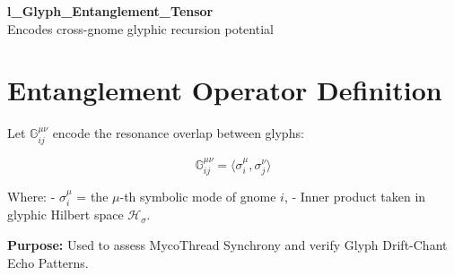 \documentclass[12pt]{article}
\begin{document}
\begin{center}
    {\LARGE \textbf{l\_Glyph\_Entanglement\_Tensor}}\\[1em]
    {\small Encodes cross-gnome glyphic recursion potential}
\end{center}

\section*{Entanglement Operator Definition}

Let $\mathbb{G}_{ij}^{\mu\nu}$ encode the resonance overlap between glyphs:

\[
\mathbb{G}_{ij}^{\mu\nu} = \langle \sigma_i^\mu, \sigma_j^\nu \rangle
\]

Where:
- $\sigma_i^\mu$ = the $\mu$-th symbolic mode of gnome $i$,
- Inner product taken in glyphic Hilbert space $\mathcal{H}_\sigma$.

\textbf{Purpose:} Used to assess MycoThread Synchrony and verify Glyph Drift-Chant Echo Patterns.
\end{document}
